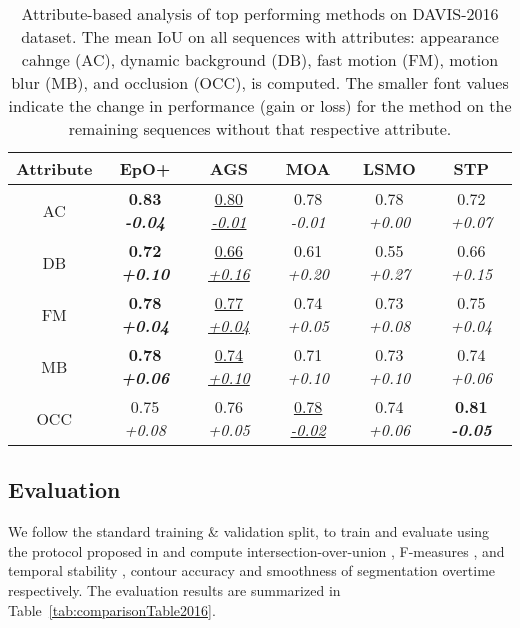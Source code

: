 \documentclass[10pt,twocolumn,letterpaper]{article}
\newcommand{\rowSpace}{\vspace{-0.4cm}}
\begin{document}
\setlength{\tabcolsep}{1.4pt}
\begin{table}[!h]
\begin{center}
\centering
\begin{tabular}{c|c|cccc}
\hline
\hline
Attribute & EpO+ & AGS\cite{ags} & MOA\cite{MotAdapt} & LSMO\cite{lsmo} & STP\cite{STP} 
\\
\hline
AC    
&\bf 0.83 \emph{\scriptsize{-0.04}}     & \underline{0.80
\emph{\scriptsize{-0.01}}}    &    0.78
\emph{\scriptsize{-0.01}}    &    0.78
\emph{\scriptsize{+0.00}}    &    0.72 \emph{\scriptsize{+0.07}}
\\
DB    &\bf 0.72 \emph{\scriptsize{+0.10}}    & \underline{0.66
\emph{\scriptsize{+0.16}}}    & 0.61
\emph{\scriptsize{+0.20}}    & 0.55
\emph{\scriptsize{+0.27}}    & 0.66 \emph{\scriptsize{+0.15}}
\\
FM    &\bf 0.78 \emph{\scriptsize{+0.04}}     & \underline{0.77
\emph{\scriptsize{+0.04}}}    & 0.74
\emph{\scriptsize{+0.05}}    & 0.73
\emph{\scriptsize{+0.08}}    & 0.75 \emph{\scriptsize{+0.04}}
\\
MB    &\bf 0.78 \emph{\scriptsize{+0.06}}    & \underline{0.74 \emph{\scriptsize{+0.10}}}    &    0.71 \emph{\scriptsize{+0.10}}    &    0.73 \emph{\scriptsize{+0.10}}    &    0.74 \emph{\scriptsize{+0.06}}          
\\
OCC    & 0.75 \emph{\scriptsize{+0.08}} &    0.76 \emph{\scriptsize{+0.05}}    & \underline{0.78 \emph{\scriptsize{-0.02}}}    &    0.74 \emph{\scriptsize{+0.06}}    &   \bf 0.81
\emph{\scriptsize{-0.05}}
\\
\hline
\hline
\end{tabular}
\caption{Attribute-based analysis of top performing methods on DAVIS-2016 dataset. The mean IoU on all sequences with attributes: appearance cahnge (AC), dynamic background (DB), fast motion (FM), motion blur (MB), and occlusion (OCC), is computed. The smaller font values indicate the change in performance (gain or loss) for the method on the remaining sequences without that respective attribute. \label{tab:attributeAnalysisDAVIS2016}}
\rowSpace
\rowSpace
\end{center}
\end{table}
\setlength{\tabcolsep}{1.4pt}
\vspace{-0.1cm}


\subsection{Evaluation}
We follow the standard training \& validation split, to train and evaluate using the protocol proposed in \cite{DAVIS2016} and compute intersection-over-union , F-measures , and temporal stability  
, contour accuracy and smoothness of segmentation overtime respectively. The evaluation results are summarized in Table~\ref{tab:comparisonTable2016}.
\end{document}
